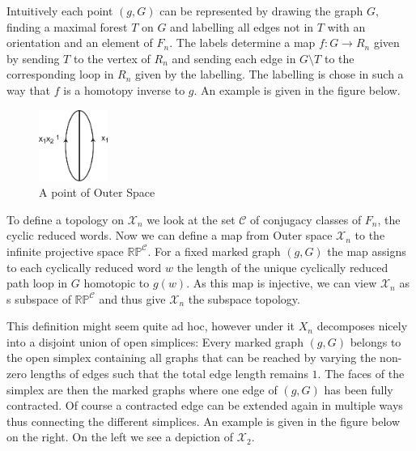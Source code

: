 Intuitively each point $(g,G)$ can be represented by drawing the graph $G$,
finding a maximal forest $T$ on $G$ and labelling all edges not in $T$ with an orientation
and an element of $F_{n}$.
The labels determine a map $f: G \to R_{n}$ given by sending $T$ to the vertex of $R_{n}$ and sending
each edge in $G \setminus T$ to the corresponding loop in $R_{n}$ given by the labelling.
The labelling is chose in such a way that $f$ is a homotopy inverse to $g$.
An example is given in the figure below.
\begin{figure}[h]
	\centering
	\includegraphics[width=0.2\textwidth]{./Images/pointOfOuterSpace.pdf}
	\caption{A point of Outer Space}
\end{figure}

To define a topology on $\mathcal{X}_{n}$ we look at the set $\mathcal{C}$ of conjugacy classes of $F_{n}$, the cyclic reduced words.
Now we can define a map from Outer space $\mathcal{X}_{n}$ to the infinite projective space $\mathbb{RP}^{\mathcal{C}}$.
For a fixed marked graph $(g,G)$ the map assigns to each cyclically reduced word $w$ the length
of the unique cyclically reduced path loop in $G$ homotopic to $g(w)$.
As this map is injective, we can view $\mathcal{X}_{n}$ as s subspace of $\mathbb{RP}^{\mathcal{C}}$ and thus
give $\mathcal{X}_{n}$ the subspace topology.

This definition might seem quite ad hoc, however under it $X_{n}$ decomposes nicely into
a disjoint union of open simplices: Every marked graph $(g,G)$ belongs to the open simplex
containing all graphs that can be reached by varying the non-zero lengths of edges such that
the total edge length remains $1$. The faces of the simplex are then the marked graphs where one edge of $(g,G)$
has been fully contracted. Of course a contracted edge can be extended again in multiple ways thus connecting
the different simplices. An example is given in the figure below on the right.
On the left we see a depiction of $\mathcal{X}_{2}$.

